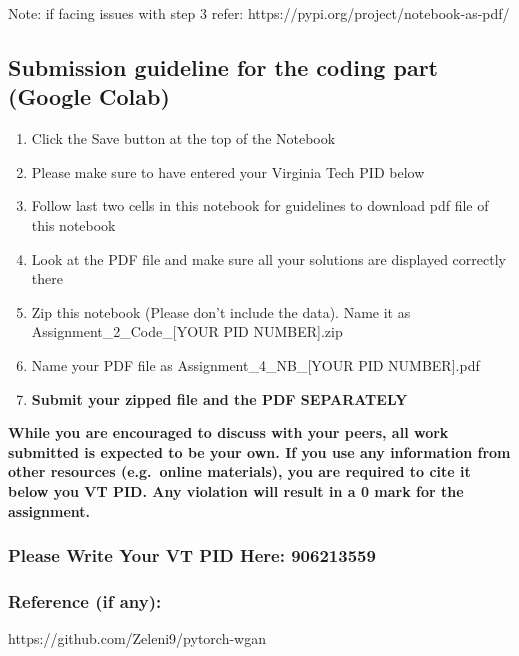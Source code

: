 \documentclass[11pt]{article}
\providecommand{\tightlist}{%
      \setlength{\itemsep}{0pt}\setlength{\parskip}{0pt}}
\begin{document}
Note: if facing issues with step 3 refer:
https://pypi.org/project/notebook-as-pdf/

\hypertarget{submission-guideline-for-the-coding-part-google-colab}{%
\subsection{Submission guideline for the coding part (Google
Colab)}\label{submission-guideline-for-the-coding-part-google-colab}}

\begin{enumerate}
\def\labelenumi{\arabic{enumi}.}
\tightlist
\item
  Click the Save button at the top of the Notebook
\item
  Please make sure to have entered your Virginia Tech PID below
\item
  Follow last two cells in this notebook for guidelines to download pdf
  file of this notebook
\item
  Look at the PDF file and make sure all your solutions are displayed
  correctly there
\item
  Zip this notebook (Please don't include the data). Name it as
  Assignment\_2\_Code\_{[}YOUR PID NUMBER{]}.zip
\item
  Name your PDF file as Assignment\_4\_NB\_{[}YOUR PID NUMBER{]}.pdf
\item
  \textbf{ Submit your zipped file and the PDF SEPARATELY}
\end{enumerate}

\textbf{While you are encouraged to discuss with your peers, {all work
submitted is expected to be your own.} {If you use any information from
other resources (e.g.~online materials), you are required to cite it
below you VT PID. Any violation will result in a 0 mark for the
assignment.}}

    \hypertarget{please-write-your-vt-pid-here-906213559}{%
\subsubsection{Please Write Your VT PID Here:
906213559}\label{please-write-your-vt-pid-here-906213559}}

\hypertarget{reference-if-any}{%
\subsubsection{Reference (if any):}\label{reference-if-any}}

https://github.com/Zeleni9/pytorch-wgan
\end{document}
